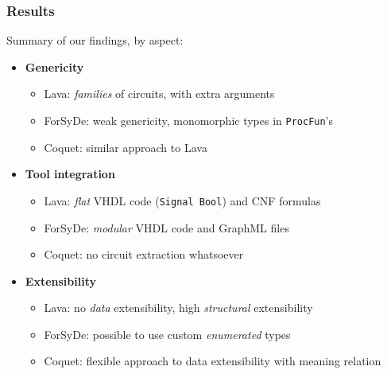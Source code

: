    \begin{frame}
        \frametitle{Results}
        \par{Summary of our findings, by aspect:}
        \vspace{0.2cm}
        \begin{itemize}
            \item \textbf{Genericity}
                \begin{itemize}
                    \item Lava: \emph{families} of circuits, with extra arguments
                    \item ForSyDe: weak genericity, monomorphic types in \texttt{ProcFun}'s
                    \item Coquet: similar approach to Lava
                \end{itemize}
            \item \textbf{Tool integration}
                \begin{itemize}
                    \item Lava: \emph{flat} VHDL code (\texttt{Signal Bool}) and CNF formulas
                    \item ForSyDe: \emph{modular} VHDL code and GraphML files
                    \item Coquet: no circuit extraction whatsoever
                \end{itemize}
            \item \textbf{Extensibility}
                \begin{itemize}
                    \item Lava: no \emph{data} extensibility, high \emph{structural} extensibility
                    \item ForSyDe: possible to use custom \emph{enumerated} types
                    \item Coquet: flexible approach to data extensibility with meaning relation
                \end{itemize}
        \end{itemize}

    \end{frame}

